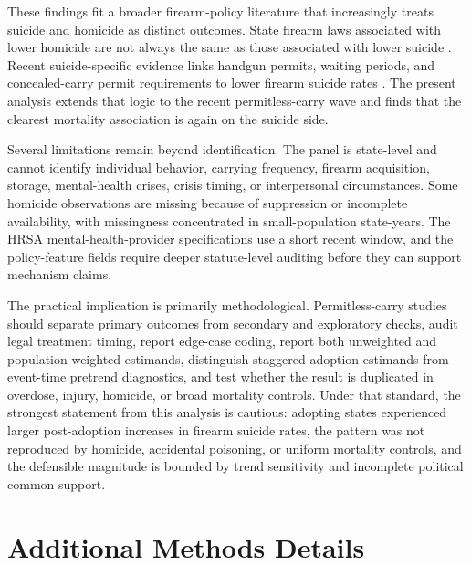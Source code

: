 \documentclass[11pt]{article}
\begin{document}
These findings fit a broader firearm-policy literature that increasingly treats suicide and homicide as distinct outcomes. State firearm laws associated with lower homicide are not always the same as those associated with lower suicide \citep{siegel2019,sharkey2023}. Recent suicide-specific evidence links handgun permits, waiting periods, and concealed-carry permit requirements to lower firearm suicide rates \citep{siegel2026}. The present analysis extends that logic to the recent permitless-carry wave and finds that the clearest mortality association is again on the suicide side.

Several limitations remain beyond identification. The panel is state-level and cannot identify individual behavior, carrying frequency, firearm acquisition, storage, mental-health crises, crisis timing, or interpersonal circumstances. Some homicide observations are missing because of suppression or incomplete availability, with missingness concentrated in small-population state-years. The HRSA mental-health-provider specifications use a short recent window, and the policy-feature fields require deeper statute-level auditing before they can support mechanism claims.

The practical implication is primarily methodological. Permitless-carry studies should separate primary outcomes from secondary and exploratory checks, audit legal treatment timing, report edge-case coding, report both unweighted and population-weighted estimands, distinguish staggered-adoption estimands from event-time pretrend diagnostics, and test whether the result is duplicated in overdose, injury, homicide, or broad mortality controls. Under that standard, the strongest statement from this analysis is cautious: adopting states experienced larger post-adoption increases in firearm suicide rates, the pattern was not reproduced by homicide, accidental poisoning, or uniform mortality controls, and the defensible magnitude is bounded by trend sensitivity and incomplete political common support.

\section*{Additional Methods Details}
\end{document}
